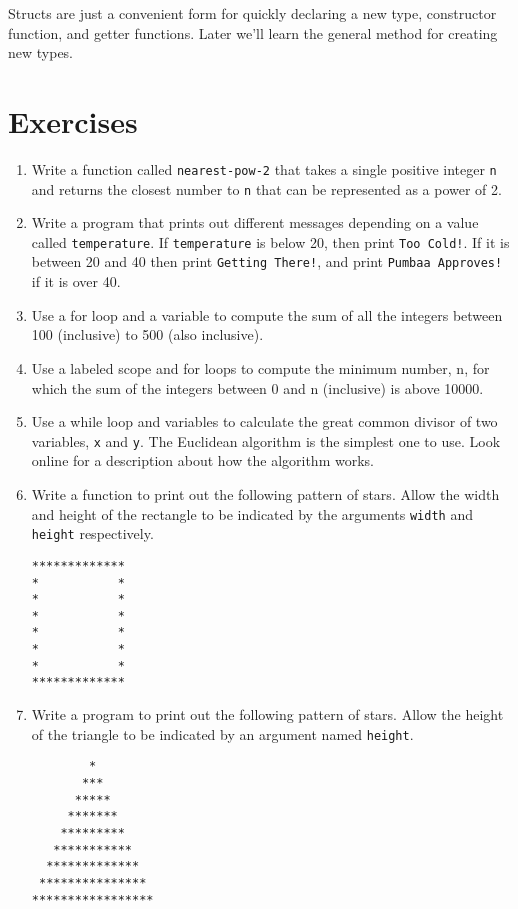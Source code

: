 \documentclass[10pt,oneside]{book}
\begin{document}
Structs are just a convenient form for quickly declaring a new type, constructor function, and getter functions. Later we'll learn the general method for creating new types.

\section{Exercises}
\begin{enumerate}
\item Write a function called \texttt{\frenchspacing nearest-pow-2} that takes a single positive integer \texttt{\frenchspacing n} and returns the closest number to \texttt{\frenchspacing n} that can be represented as a power of 2.

\item Write a program that prints out different messages depending on a value called \texttt{\frenchspacing temperature}. If \texttt{\frenchspacing temperature} is below 20, then print \texttt{\frenchspacing Too Cold!}. If it is between 20 and 40 then print \texttt{\frenchspacing Getting There!}, and print \texttt{\frenchspacing Pumbaa Approves!} if it is over 40. 

\item Use a for loop and a variable to compute the sum of all the integers between 100 (inclusive) to 500 (also inclusive). 

\item Use a labeled scope and for loops to compute the minimum number, n, for which the sum of the integers between 0 and n (inclusive) is above 10000. 

\item Use a while loop and variables to calculate the great common divisor of two variables, \texttt{\frenchspacing x} and \texttt{\frenchspacing y}. The Euclidean algorithm is the simplest one to use. Look online for a description about how the algorithm works.

\item Write a function to print out the following pattern of stars. Allow the width and height of the rectangle to be indicated by the arguments \texttt{\frenchspacing width} and \texttt{\frenchspacing height} respectively.
\begin{lstlisting}
*************
*           *
*           *
*           *
*           *
*           *
*           *
*************
\end{lstlisting}

\item Write a program to print out the following pattern of stars. Allow the height of the triangle to be indicated by an argument named \texttt{\frenchspacing height}.
\begin{lstlisting}
        *                              
       ***                             
      *****                            
     *******                           
    *********                          
   ***********                         
  *************                        
 ***************                       
*****************                     
\end{lstlisting}


\end{enumerate}
\end{document}

